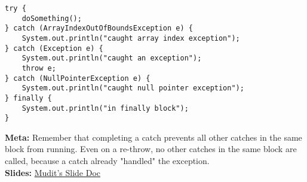\question
\begin{lstlisting}
try {
    doSomething();
} catch (ArrayIndexOutOfBoundsException e) {
    System.out.println("caught array index exception");
} catch (Exception e) {
    System.out.println("caught an exception");
    throw e;
} catch (NullPointerException e) {
    System.out.println("caught null pointer exception");
} finally {
    System.out.println("in finally block");
}
\end{lstlisting}

\begin{solution}
\textbf{Meta:} Remember that completing a catch prevents all other catches
in the same block from running. Even on a re-throw, no other catches in the
same block are called, because a catch already "handled" the exception. \\
\textbf{Slides:} \href{https://docs.google.com/presentation/d/1j418bduZS2Ltm6dVVg-b3WpGbOGrRUm6DKRkZCByuaQ/edit?usp=sharing}{Mudit's Slide Doc}
\end{solution}
